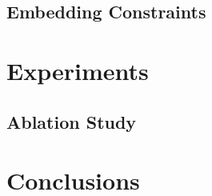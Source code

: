 \documentclass[10pt,twocolumn,letterpaper]{article}
\begin{document}
\subsection{Embedding Constraints}



\section{Experiments}


\subsection{Ablation Study}



\section{Conclusions}







	
	
\end{document}
